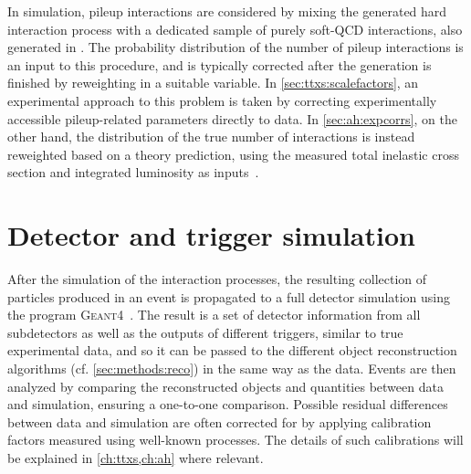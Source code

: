 In simulation, pileup interactions are considered by mixing the generated hard interaction process with a dedicated sample of purely soft-QCD interactions, also generated in \pythia. The probability distribution of the number of pileup interactions is an input to this procedure, and is typically corrected after the generation is finished by reweighting in a suitable variable. In \cref{sec:ttxs:scalefactors}, an experimental approach to this problem is taken by correcting experimentally accessible pileup-related parameters directly to data. In \cref{sec:ah:expcorrs}, on the other hand, the distribution of the true number of interactions is instead reweighted based on a theory prediction, using the measured total inelastic cross section and integrated luminosity as inputs~\cite{CMS:LUM-17-003}.

\section{Detector and trigger simulation}
\label{sec:mc:detector}

After the simulation of the interaction processes, the resulting collection of particles produced in an event is propagated to a full detector simulation using the program \textsc{Geant4}~\cite{GEANT4:2002}. 
The result is a set of detector information from all subdetectors as well as the outputs of different triggers, similar to true experimental data, and so it can be passed to the different object reconstruction algorithms (cf. \cref{sec:methods:reco}) in the same way as the data. Events are then analyzed by comparing the reconstructed objects and quantities between data and simulation, ensuring a one-to-one comparison. Possible residual differences between data and simulation are often corrected for by applying calibration factors measured using well-known processes. The details of such calibrations will be explained in \cref{ch:ttxs,ch:ah} where relevant.